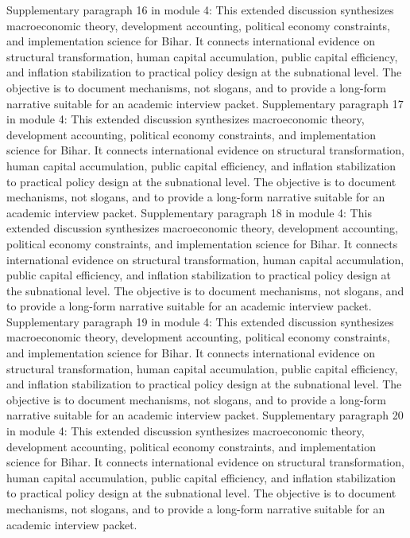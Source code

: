 \documentclass[preprint,12pt]{elsarticle}
\begin{document}
Supplementary paragraph 16 in module 4: This extended discussion synthesizes macroeconomic theory, development accounting, political economy constraints, and implementation science for Bihar. It connects international evidence on structural transformation, human capital accumulation, public capital efficiency, and inflation stabilization to practical policy design at the subnational level. The objective is to document mechanisms, not slogans, and to provide a long-form narrative suitable for an academic interview packet.
Supplementary paragraph 17 in module 4: This extended discussion synthesizes macroeconomic theory, development accounting, political economy constraints, and implementation science for Bihar. It connects international evidence on structural transformation, human capital accumulation, public capital efficiency, and inflation stabilization to practical policy design at the subnational level. The objective is to document mechanisms, not slogans, and to provide a long-form narrative suitable for an academic interview packet.
Supplementary paragraph 18 in module 4: This extended discussion synthesizes macroeconomic theory, development accounting, political economy constraints, and implementation science for Bihar. It connects international evidence on structural transformation, human capital accumulation, public capital efficiency, and inflation stabilization to practical policy design at the subnational level. The objective is to document mechanisms, not slogans, and to provide a long-form narrative suitable for an academic interview packet.
Supplementary paragraph 19 in module 4: This extended discussion synthesizes macroeconomic theory, development accounting, political economy constraints, and implementation science for Bihar. It connects international evidence on structural transformation, human capital accumulation, public capital efficiency, and inflation stabilization to practical policy design at the subnational level. The objective is to document mechanisms, not slogans, and to provide a long-form narrative suitable for an academic interview packet.
Supplementary paragraph 20 in module 4: This extended discussion synthesizes macroeconomic theory, development accounting, political economy constraints, and implementation science for Bihar. It connects international evidence on structural transformation, human capital accumulation, public capital efficiency, and inflation stabilization to practical policy design at the subnational level. The objective is to document mechanisms, not slogans, and to provide a long-form narrative suitable for an academic interview packet.
\end{document}
